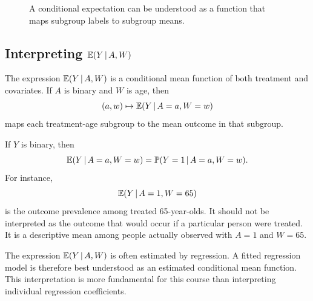 \begin{figure}[H]
\centering
{}
\caption{A conditional expectation can be understood as a function that maps subgroup labels to subgroup means.}
\end{figure}

\subsection{Interpreting $\mathbb{E}(Y\,\vert\, A,W)$}

The expression $\mathbb{E}(Y\,\vert\, A,W)$ is a conditional mean function of both treatment and covariates. If $A$ is binary and $W$ is age, then
\[
(a,w)\mapsto \mathbb{E}(Y\,\vert\, A=a,W=w)
\]
maps each treatment-age subgroup to the mean outcome in that subgroup.

If $Y$ is binary, then
\[
\mathbb{E}(Y\,\vert\, A=a,W=w)=\mathbb{P}(Y=1\,\vert\, A=a,W=w).
\]
For instance,
\[
\mathbb{E}(Y\,\vert\, A=1,W=65)
\]
is the outcome prevalence among treated 65-year-olds. It should not be interpreted as the outcome that would occur if a particular person were treated. It is a descriptive mean among people actually observed with $A=1$ and $W=65$.

\begin{remark}
The expression $\mathbb{E}(Y\,\vert\, A,W)$ is often estimated by regression. A fitted regression model is therefore best understood as an estimated conditional mean function. This interpretation is more fundamental for this course than interpreting individual regression coefficients.
\end{remark}
